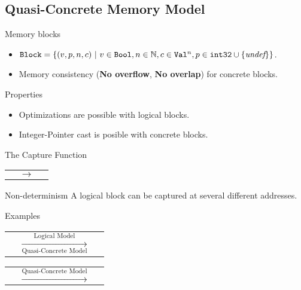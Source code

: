 \subsection{Quasi-Concrete Memory Model}
\begin{frame}{\subsecname}

  \begin{block}{Memory blocks}
    \begin{itemize}
    \item $\texttt{Block}=\{(v,p,n,c)~|~v\in\texttt{Bool},n\in\mathbb{N},c\in\texttt{Val}^{n},p\in\texttt{int32}\cup\{\textit{undef}\}\}$.
    \item Memory consistency (\textbf{No overflow}, \textbf{No overlap}) for concrete blocks.
    \end{itemize}
  \end{block}
  \vfill
  \begin{exampleblock}{Properties}
    \begin{itemize}
    \item Optimizations are possible with logical blocks.
    \item Integer-Pointer cast is posible with concrete blocks.
    \end{itemize}
  \end{exampleblock}
  
\end{frame}

\begin{frame}{The Capture Function}

  \begin{tabular}{l c r}
     & $\longrightarrow$ &
    
  \end{tabular}
  \vfill
  \begin{alertblock}{Non-determinism}
    A logical block can be captured at several different addresses.
  \end{alertblock}
  
\end{frame}

\begin{frame}{Examples}
  \begin{tabular}{l c r}
     &
    $\xrightarrow[\text{Quasi-Concrete Model}]{\text{Logical Model}}$ & 
    
  \end{tabular}
  \vfill
  \begin{tabular}{l c r}
     &
    $\xrightarrow{\text{Quasi-Concrete Model}}$ &
    
  \end{tabular}

\end{frame}
